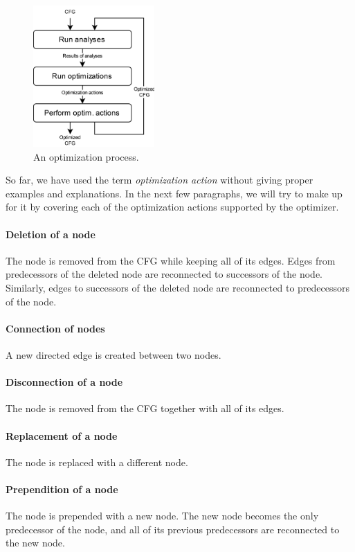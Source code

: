 \documentclass[thesis=M,english]{FITthesis}[2019/12/23]
\begin{document}
\begin{figure}
    \centering
    \includegraphics[height=5.4cm]{img/optimizing}
    \caption{An optimization process.}\label{fig:optimizing}
\end{figure}

So far, we have used the term \emph{optimization action} without giving proper examples and explanations. In the next few paragraphs, we will try to make up for it by covering each of the optimization actions supported by the optimizer.

\paragraph*{Deletion of a node} The node is removed from the CFG while keeping all of its edges. Edges from predecessors of the deleted node are reconnected to successors of the node. Similarly, edges to successors of the deleted node are reconnected to predecessors of the node.

\paragraph*{Connection of nodes} A new directed edge is created between two nodes.

\paragraph*{Disconnection of a node} The node is removed from the CFG together with all of its edges.

\paragraph*{Replacement of a node} The node is replaced with a different node.

\paragraph*{Prependition of a node} The node is prepended with a new node. The new node becomes the only predecessor of the node, and all of its previous predecessors are reconnected to the new node.
\end{document}
